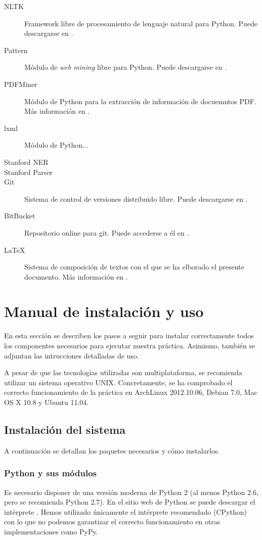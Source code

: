 \documentclass[12pt,a4paper,titlepage]{article}
\begin{document}
\begin{description}
	\item[NLTK] Framework libre de procesamiento de lenguaje natural para Python. Puede descargarse en \cite{nltk}.
	\item[Pattern] Módulo de \emph{web mining} libre para Python. Puede descargarse en \cite{pattern}.
	\item[PDFMiner] Módulo de Python para la extracción de información de docuemntos PDF. Más información en \cite{pdfminer}.
	\item[lxml] Módulo de Python...
	\item[Stanford NER]
	\item[Stanford Parser]
	\item[Git] Sistema de control de versiones distribuido libre. Puede descargarse en \cite{git}.
	\item[BitBucket] Repositorio online para git. Puede accederse a él en \cite{bitbucket}.
	\item[\LaTeX] Sistema de composición de textos con el que se ha elborado el presente documento. Más información en \cite{latex}.

\end{description}


\clearpage
\section{Manual de instalación y uso}
En esta sección se describen los pasos a seguir para instalar correctamente todos los componentes necesarios para ejecutar nuestra práctica. Asimismo, también se adjuntan las intrucciones detalladas de uso.

A pesar de que las tecnologías utilizadas son multiplataforma, se recomienda utilizar un sistema operativo UNIX. Concretamente, se ha comprobado el correcto funcionamiento de la práctica en ArchLinux 2012.10.06, Debian 7.0, Mac OS X 10.8 y Ubuntu 11.04.

\subsection{Instalación del sistema}
A continuación se detallan los paquetes necesarios y cómo instalarlos.

\subsubsection{Python y sus módulos}
Es necesario disponer de una versión moderna de Python 2 (al menos Python 2.6, pero se recomienda Python 2.7). En el sitio web de Python se puede descargar el intérprete \cite{python}. Hemos utilizado únicamente el intérprete recomendado (CPython) con lo que no podemos garantizar el correcto funcionamiento en otras implementaciones como PyPy.
\end{document}
